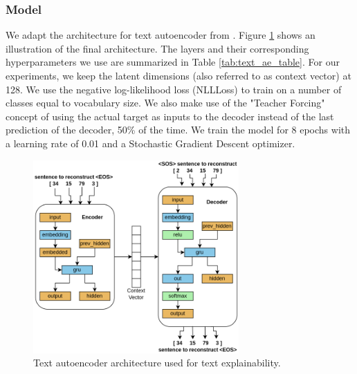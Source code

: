 \subsubsection{Model}
\label{sssec:textmodel}

We adapt the architecture for text autoencoder from \citep{torchseq2seq}. Figure \ref{fig:textautoencoderarch} shows an illustration of the final architecture. The layers and their corresponding hyperparameters we use are summarized in Table \ref{tab:text_ae_table}. For our experiments, we keep the latent dimensions (also referred to as context vector) at 128. We use the negative log-likelihood loss (NLLLoss) to train on a number of classes equal to vocabulary size. We also make use of the "Teacher Forcing" concept of using the actual target as inputs to the decoder instead of the last prediction of the decoder, 50\% of the time. We train the model for 8 epochs with a learning rate of 0.01 and a Stochastic Gradient Descent optimizer.

\begin{figure}[h!]
\centering
    \includegraphics[width=0.7\textwidth]{images/example_imp/text_autoencoder.png}
\caption{Text autoencoder architecture used for text explainability.}\label{fig:textautoencoderarch}
\end{figure}

